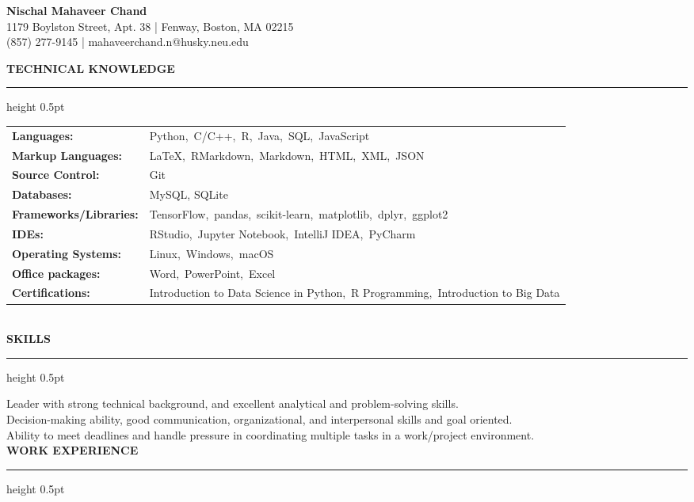 \documentclass[a4paper]{article}
\newcommand{\myline}{\par
  \kern2pt %
  \hrule height 0.5pt
  \kern2pt %
}
\newcommand{\mybullet}{
	\indent \textbullet \hspace*{2mm}
}
\begin{document}
	\begin{center}
		{\Large \textbf{Nischal Mahaveer Chand}} \\
		1179 Boylston Street, Apt. 38 | Fenway, Boston, MA 02215 \\%
		(857) 277-9145 | mahaveerchand.n@husky.neu.edu \\
	\end{center}
	
	\noindent
	{\large \textbf{TECHNICAL KNOWLEDGE}}
	\myline 
	
	\noindent
	\begin{tabular}{ m{3.5cm} l }
		\textbf{Languages: } & Python,\ C/C++,\ R,\ Java,\ SQL,\ JavaScript \\ %
		\textbf{Markup Languages: } & LaTeX,\ RMarkdown,\ Markdown,\ HTML,\ XML,\ JSON \\
		\textbf{Source Control: } & Git \\
		\textbf{Databases: } & MySQL, SQLite\\
		\textbf{Frameworks/Libraries: } & TensorFlow,\ pandas,\ scikit-learn,\ matplotlib,\ dplyr,\ ggplot2 \\
		\textbf{IDEs: } & RStudio,\ Jupyter Notebook,\ IntelliJ IDEA,\ PyCharm\\
		\textbf{Operating Systems: } & Linux,\ Windows,\ macOS \\
		\textbf{Office packages: } & Word,\ PowerPoint,\ Excel \\
		\textbf{Certifications: } & Introduction to Data Science in Python,\ R Programming,\ Introduction to Big Data 
	\end{tabular} \\

	\smallskip
	\noindent
	{\large \textbf{SKILLS}}
	\myline 
	\smallskip
	
	\mybullet Leader with strong technical background, and excellent analytical and problem-solving skills. \\
	\mybullet Decision-making ability, good communication, organizational, and interpersonal skills and goal oriented. \\
	\mybullet Ability to meet deadlines and handle pressure in coordinating multiple tasks in a work/project environment. \\
	
	\smallskip
	\noindent
	{\large \textbf{WORK EXPERIENCE}}
	\myline 
	\smallskip
	
\end{document}
